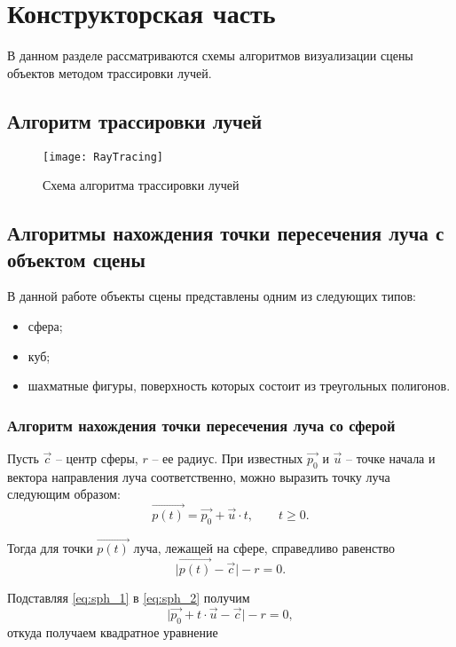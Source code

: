 \chapter{Конструкторская часть}
В данном разделе рассматриваются схемы алгоритмов визуализации сцены объектов методом трассировки лучей.

\section{Алгоритм трассировки лучей}
\begin{figure}[H]
	\centering
	\texttt{[image: RayTracing]}
	\caption{Схема алгоритма трассировки лучей}
	\label{fig:RayTracing}
\end{figure}

\section{Алгоритмы нахождения точки пересечения луча с объектом сцены}
В данной работе объекты сцены представлены одним из следующих типов:
\begin{itemize}
	\item сфера;
	\item куб;
	\item шахматные фигуры, поверхность которых состоит из треугольных полигонов.
\end{itemize}

\subsection{Алгоритм нахождения точки пересечения луча со сферой}
Пусть $\vec{c}$ -- центр сферы, $r$ -- ее радиус. При известных $\vec{p_0}$ и $\vec{u}$ -- точке начала и вектора направления луча соответственно, можно выразить точку луча следующим образом:
\begin{equation}\label{eq:sph_1}
	\vec{p(t)} = \vec{p_0} + \vec{u} \cdot t, \qquad t \ge 0.
\end{equation}

Тогда для точки $\vec{p(t)}$ луча, лежащей на сфере, справедливо равенство
\begin{equation}\label{eq:sph_2}
	\lvert\vec{p(t)}-\vec{c}\rvert - r = 0.
\end{equation}

Подставляя \ref{eq:sph_1} в \ref{eq:sph_2} получим
\begin{equation}
	\lvert\vec{p_0} + t\cdot\vec{u} - \vec{c}\rvert - r = 0,
\end{equation} откуда получаем квадратное уравнение

